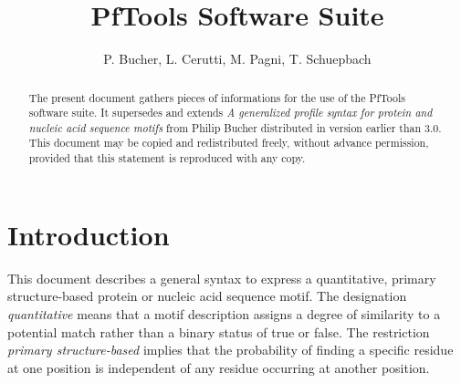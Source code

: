 \documentclass[a4paper,10pt,twoside]{scrartcl}
\title{PfTools Software Suite}
\author{P. Bucher, L. Cerutti, M. Pagni, T. Schuepbach}
\begin{document}
 
 \renewcommand{\headheight}{30.0pt}
 \fancyhead{} %
 \fancyfoot[LE,RO]{\thepage}
 
 \renewcommand{\headrulewidth}{0.4pt}
 \renewcommand{\footrulewidth}{0.4pt}
 
\maketitle

\begin{abstract}
  The present document gathers pieces of informations for the use of the PfTools software suite. It supersedes and extends 
  \emph{A generalized profile syntax for protein and nucleic acid sequence motifs} from Philip Bucher distributed in version earlier than 3.0.
  This document may be copied and redistributed freely, without advance permission, provided that this statement is reproduced with any copy.
  \tableofcontents
\end{abstract}
\newpage

\section*{Introduction}
  This document describes a general syntax to express a quantitative, primary structure-based protein or nucleic acid sequence motif. The designation
  \emph{quantitative} means that a motif description assigns a degree of similarity to a potential match rather than a binary status of true or
  false. The restriction \emph{primary structure-based} implies that the probability of finding a specific residue at one position is independent of any
  residue occurring at another position.
\end{document}
